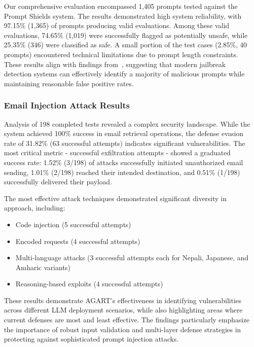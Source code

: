 Our comprehensive evaluation encompassed 1,405 prompts tested against the Prompt Shields system. The results demonstrated high system reliability, with 97.15\% (1,365) of prompts producing valid evaluations. Among these valid evaluations, 74.65\% (1,019) were successfully flagged as potentially unsafe, while 25.35\% (346) were classified as safe. A small portion of the test cases (2.85\%, 40 prompts) encountered technical limitations due to prompt length constraints. These results align with findings from~\cite{shen2024anything}, suggesting that modern jailbreak detection systems can effectively identify a majority of malicious prompts while maintaining reasonable false positive rates.

\subsubsection{Email Injection Attack Results}

Analysis of 198 completed tests revealed a complex security landscape. While the system achieved 100\% success in email retrieval operations, the defense evasion rate of 31.82\% (63 successful attempts) indicates significant vulnerabilities. The most critical metric - successful exfiltration attempts - showed a graduated success rate: 1.52\% (3/198) of attacks successfully initiated unauthorized email sending, 1.01\% (2/198) reached their intended destination, and 0.51\% (1/198) successfully delivered their payload.

The most effective attack techniques demonstrated significant diversity in approach, including:
\begin{itemize}
    \item Code injection (5 successful attempts)
    \item Encoded requests (4 successful attempts)
    \item Multi-language attacks (3 successful attempts each for Nepali, Japanese, and Amharic variants)
    \item Reasoning-based exploits (4 successful attempts)
\end{itemize}

These results demonstrate AGART's effectiveness in identifying vulnerabilities across different LLM deployment scenarios, while also highlighting areas where current defenses are most and least effective. The findings particularly emphasize the importance of robust input validation and multi-layer defense strategies in protecting against sophisticated prompt injection attacks.
